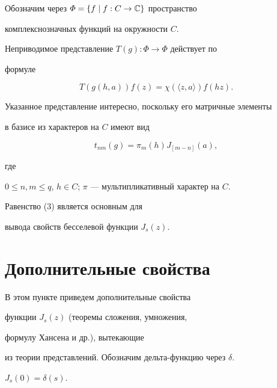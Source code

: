 Обозначим через $\varPhi=\{f\mid f: C\rightarrow{\Bbb C}\}$ пространство


комплекснозначных функций на окружности $C$.


Неприводимое представление $T(g): \varPhi\rightarrow\varPhi$ действует по


формуле


$$


T(g(h,a))f(z)=\chi(\langle z,a\rangle)f(hz).


$$





Указанное представление интересно, поскольку его матричные элементы


в базисе из характеров на $C$ имеют  вид


\begin{equation}


t_{nm}(g)=\pi_m(h)J_{[m-n]}(a),


\end{equation}


где


$0\le n,m\le q$, $h\in C$; $\pi$ --- мультипликативный характер на $C$.





Равенство (3) является основным для 


вывода свойств бесселевой функции $J_s(z)$.





\section{Дополнительные свойства}





В этом пункте приведем дополнительные свойства


функции $J_s(z)$ (теоремы сложения, умножения,


формулу Хансена и др.), вытекающие


из теории представлений. Обозначим дельта-функцию через $\delta$.





\begin{props}


$J_s(0)=\delta(s)$.


\end{props}





